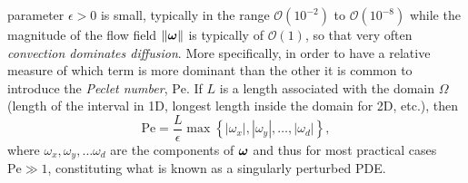 parameter $\epsilon>0$ is small, typically in the range $\mathscr{O}(10^{-2})$ to $\mathscr{O}(10^{-8})$
while the magnitude of the flow field $\|\bm{\omega}\|$ is typically of
$\mathscr{O}(1)$, so that very often \emph{convection dominates diffusion}.
More specifically, in order to have a relative measure of which term is more
dominant than the other it is common to introduce the \emph{Peclet number},
$\text{Pe}$. If $L$ is a length associated with the domain $\Omega$ (length of
the interval in 1D, longest length inside the domain for 2D, etc.), then
%
\begin{equation}\label{eq:back:Peclet}
\text{Pe}=
\frac{L}{\epsilon}\max\left\{|\omega_x|,|\omega_y|,\ldots,|\omega_d|\right\},
\end{equation}
%
where $\omega_x,\omega_y,\ldots\omega_d$ are the components of $\bm{\omega}$ and thus
for most practical cases $\text{Pe}\gg1$, constituting what is known as a
singularly perturbed PDE.
%
%
%
%
%

